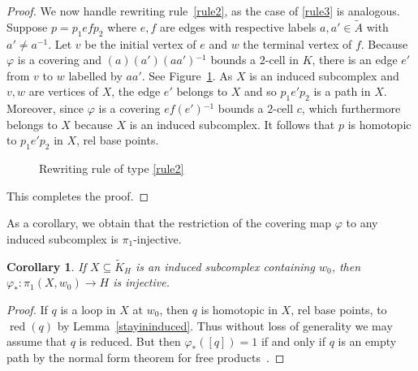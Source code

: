 \documentclass[11pt,reqno]{amsart}
\newtheorem{Cor}[Thm]{Corollary}
\begin{document}
\begin{proof}
We now handle rewriting rule~\eqref{rule2}, as the case of \eqref{rule3} is analogous. Suppose $p=p_1efp_2$ where $e,f$ are edges with respective labels $a,a'\in {\ensuremath{\widetilde {A}}}$ with $a'\neq a{^{-1}}$.  Let $v$ be the initial vertex of $e$ and $w$ the terminal vertex of $f$.  Because ${\varphi}$ is a covering and $(a)(a')(aa'){^{-1}}$ bounds a $2$-cell in $K$, there is an edge $e'$ from $v$ to $w$ labelled by $aa'$. See Figure~\ref{figurerule2}. As $X$ is an induced subcomplex and $v,w$ are vertices of $X$, the edge $e'$ belongs to $X$ and so $p_1e'p_2$ is a path in $X$.  Moreover, since ${\varphi}$ is a covering $ef(e'){^{-1}}$ bounds a $2$-cell $c$, which furthermore belongs to $X$ because $X$ is an induced subcomplex.  It follows that $p$ is homotopic to $p_1e'p_2$ in $X$, rel base points.
\begin{figure}[bt]
\begin{center}
\end{center}
\caption{Rewriting rule of type \eqref{rule2}\label{figurerule2}}
\end{figure}
This completes the proof.
\end{proof}

As a corollary, we obtain that the restriction of the covering map ${\varphi}$ to any induced subcomplex is $\pi_1$-injective.

\begin{Cor}\label{pi1inj}
If $X\subseteq {\ensuremath{\widetilde {K}}}_H$ is an induced subcomplex containing $w_0$, then ${\varphi}_*\colon \pi_1(X,w_0){\rightarrow} H$ is injective.
\end{Cor}
\begin{proof}
If $q$ is a loop in $X$ at $w_0$, then $q$ is homotopic in $X$, rel base points, to ${\mathop{\mathrm{red}}\nolimits}(q)$ by Lemma~\ref{stayininduced}.  Thus without loss of generality we may assume that $q$ is reduced.  But then ${\varphi}_*([q])=1$ if and only if $q$ is an empty path by the normal form theorem for free products~\cite[Chapter~IV, Theorem~1.2]{LyndonandSchupp}.
\end{proof}
\end{document}
